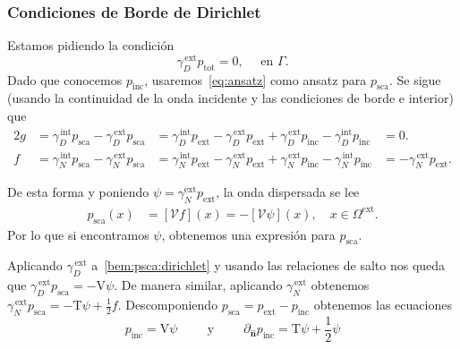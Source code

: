 \documentclass[11pt]{article}
\numberwithin{equation}{section}
\def\n{\hat{\textbf{n}}}
\def\Slpot{\mathcal{V}}
\def\Slop{\mathrm{V}}
\def\Adlop{\mathrm{T}}
\def\traceN{\gamma_{N}}
\def\traceD{\gamma_{D}}
\def\tot{\textrm{tot}}
\def\exterior{\textrm{ext}}
\def\interior{\textrm{int}}
\def\inc{\textrm{inc}}
\def\sca{\textrm{sca}}
\begin{document}
\subsubsection{Condiciones de Borde de Dirichlet}
\label{sssec:bem:exterior:dirichlet}

\noindent Estamos pidiendo la condición
\begin{equation}\label{bem:condicion dirichlet}
	\traceD^{\,\exterior} p_{\tot} = 0, \quad \text{ en } \Gamma.
\end{equation}
Dado que conocemos \(p_{\inc}\), usaremos~\eqref{eq:ansatz} como ansatz
para \(p_{\sca}\). Se sigue (usando la continuidad de la onda
incidente y las condiciones de borde e interior) que
\begin{alignat*}{2}
	g
	&=
	\traceD^{\,\interior} p_{\sca} - \traceD^{\,\exterior} p_{\sca}
	&=
	\traceD^{\,\interior} p_{\exterior}
	-
	\traceD^{\,\exterior} p_{\exterior}
	+
	\traceD^{\,\exterior} p_{\inc} - \gamma_D^{\interior} p_{\inc}
	&=
	0.
	\\
	f
	&=
	\traceN^{\,\interior} p_{\sca} - \traceN^{\,\exterior} p_{\sca}
	&=
	\traceN^{\,\interior} p_{\exterior} - \traceN^{\,\exterior} p_{\exterior}
	+
	\traceN^{\,\exterior} p_{\inc} - \traceN^{\,\interior} p_{\inc}
	&=
	- \traceN^{\,\exterior} p_{\exterior}.
\end{alignat*}

De esta forma y poniendo \(\psi = \traceN^{\exterior} p_{\exterior}\), la onda dispersada se lee
\begin{align}\label{bem:psca:dirichlet}
	p_{\sca}(x)
	&=
	\left[ \Slpot f \right] (x)
	=
	-\left[ \Slpot \psi \right](x)
	,\quad x\in \Omega^{\exterior}.
\end{align}
Por lo que si encontramos \(\psi\), obtenemos una expresión para \(p_{\sca}\). 

Aplicando \(\traceD^{\,\exterior}\) a~\eqref{bem:psca:dirichlet} y usando las relaciones
de salto nos queda que \( \traceD^{\,\exterior} p_{\sca} = -\Slop \psi \).
De manera similar, aplicando \(\traceN^{\,\exterior}\) obtenemos
\(\traceN^{\,\exterior} p_{\sca} = -\Adlop \psi + \frac{1}{2} f\).
Descomponiendo \(p_{\sca} = p_{\exterior} - p_{\inc}\) obtenemos las ecuaciones
\begin{displaymath}
	p_{\inc} = \Slop \psi
	\hspace{1cm}\text{y}\hspace{1cm}
	\partial_{\n} p_{\inc} = \Adlop \psi + \frac{1}{2} \psi
\end{displaymath}
\end{document}
